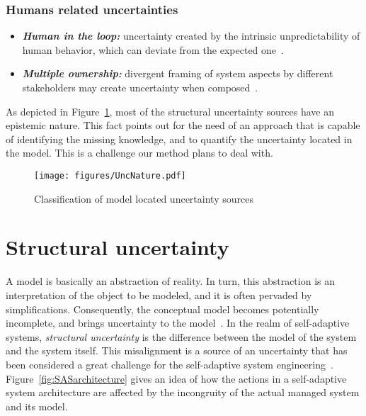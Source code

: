 \subsubsection{Humans related uncertainties}
\begin{itemize}
\item \textbf{\textit{Human in the loop:}} uncertainty created by the intrinsic unpredictability of human behavior, which can deviate from the expected one~\cite{EsfahaniM10,camara2015reasoning}.

\item \textbf{\textit{Multiple ownership:}} divergent framing of system aspects by different stakeholders
may create uncertainty when composed~\cite{ghezzi2013managing}.
\end{itemize}

As depicted in Figure~\ref{fig:UncNature}, most of the structural uncertainty sources have an epistemic nature. This fact points out for the need of an approach that is capable of identifying the missing knowledge, and to quantify the uncertainty located in the model. This is a challenge our method plans to deal with. 

\begin{figure}[!h]
	\centering
	\texttt{[image: figures/UncNature.pdf]}
	\caption{Classification of model located uncertainty sources}
	\label{fig:UncNature}
\end{figure}


\section{Structural uncertainty}

A model is basically an abstraction of reality. In turn, this abstraction is an interpretation of the object to be modeled, and it is often pervaded by simplifications. Consequently, the conceptual model becomes potentially incomplete, and brings uncertainty to the model~\cite{refsgaard2006framework}. In the realm of self-adaptive systems, \textit{structural uncertainty} is the difference between the model of the system and the system itself. This misalignment is a source of an uncertainty that has been considered a great challenge for the self-adaptive system engineering~\cite{weyns2017software}. Figure~\ref{fig:SASarchitecture} gives an idea of how the actions in a self-adaptive system architecture are affected by the incongruity of the actual managed system and its model.

